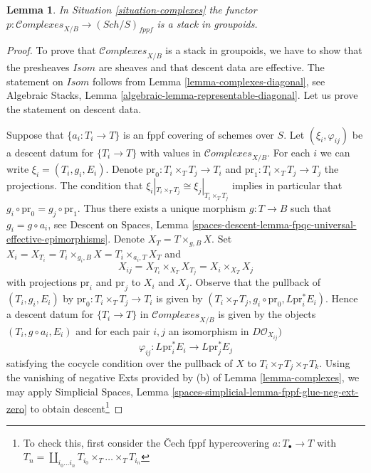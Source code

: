 \documentclass[10pt,a4paper]{amsart}
\theoremstyle{plain}
\newtheorem{lemma}[subsection]{Lemma}
\theoremstyle{definition}
\theoremstyle{remark}
\numberwithin{equation}{subsection}
\def\Sch{\mathit{Sch}}
\def\Complexesstack{\mathcal{C}\!\mathit{omplexes}}
\begin{document}
\begin{lemma}
\label{lemma-complexes-stack}
In Situation \ref{situation-complexes} the functor
$p : \Complexesstack_{X/B} \longrightarrow (\Sch/S)_{fppf}$
is a stack in groupoids.
\end{lemma}

\begin{proof}
To prove that $\Complexesstack_{X/B}$ is a stack in groupoids,
we have to show that the presheaves $\mathit{Isom}$ are sheaves
and that descent data are effective. The statement on
$\mathit{Isom}$ follows from Lemma \ref{lemma-complexes-diagonal}, see
Algebraic Stacks, Lemma \ref{algebraic-lemma-representable-diagonal}.
Let us prove the statement on descent data.

\medskip\noindent
Suppose that $\{a_i : T_i \to T\}$ is an fppf covering of schemes over $S$.
Let $(\xi_i, \varphi_{ij})$ be a descent datum for $\{T_i \to T\}$
with values in $\Complexesstack_{X/B}$.
For each $i$ we can write $\xi_i = (T_i, g_i, E_i)$.
Denote $\text{pr}_0 : T_i \times_T T_j \to T_i$ and
$\text{pr}_1 : T_i \times_T T_j \to T_j$ the projections.
The condition that $\xi_i|_{T_i \times_T T_j} \cong \xi_j|_{T_i \times_T T_j}$
implies in particular that $g_i \circ \text{pr}_0 = g_j \circ \text{pr}_1$.
Thus there exists a unique morphism $g : T \to B$ such that
$g_i = g \circ a_i$, see
Descent on Spaces, Lemma
\ref{spaces-descent-lemma-fpqc-universal-effective-epimorphisms}.
Denote $X_T = T \times_{g, B} X$. Set
$X_i = X_{T_i} = T_i \times_{g_i, B} X = T_i \times_{a_i, T} X_T$
and
$$
X_{ij} = X_{T_i} \times_{X_T} X_{T_j} = X_i \times_{X_T} X_j
$$
with projections $\text{pr}_i$ and $\text{pr}_j$ to $X_i$ and $X_j$.
Observe that the pullback of $(T_i, g_i, E_i)$
by $\text{pr}_0 : T_i \times_T T_j \to T_i$ is given by
$(T_i \times_T T_j, g_i \circ \text{pr}_0, L\text{pr}_i^*E_i)$.
Hence a descent datum for $\{T_i \to T\}$ in $\Complexesstack_{X/B}$
is given by the objects $(T_i, g \circ a_i, E_i)$
and for each pair $i, j$ an isomorphism in
$D\mathcal{O}_{X_{ij}})$
$$
\varphi_{ij} :
L\text{pr}_i^*E_i \longrightarrow L\text{pr}_j^*E_j
$$
satisfying the cocycle condition over the pullback of $X$ to
$T_i \times_T T_j \times_T T_k$.
Using the vanishing of negative Exts provided by (b) of
Lemma \ref{lemma-complexes}, we may apply
Simplicial Spaces, Lemma \ref{spaces-simplicial-lemma-fppf-glue-neg-ext-zero}
to obtain descent\footnote{To check this, first consider the
{\v C}ech fppf hypercovering $a : T_\bullet \to T$ with
$T_n = \coprod_{i_0 \ldots i_n} T_{i_0} \times_T \ldots \times_T T_{i_n}$
}
\end{proof}
\end{document}
